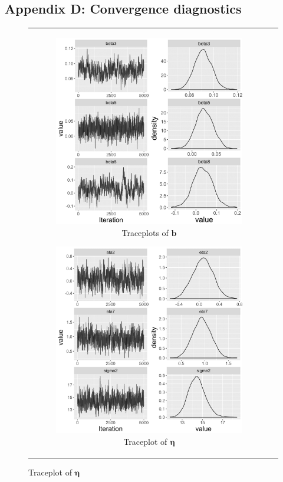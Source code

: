 \documentclass[ba]{imsart}
\numberwithin{equation}{section}
\theoremstyle{plain}
\begin{document}
		\subsection*{Appendix D: Convergence diagnostics}\label{appendix: convergence}
		\begin{figure}[H]
			\centering
			\begin{tabular}[t]{cc}
				\begin{subfigure}[b]{0.495\textwidth}
					\caption{Traceplots of $\boldsymbol{b}$}
					\includegraphics[width=\textwidth]{img/betatrace-1.png}	
				\end{subfigure}
				\begin{subfigure}[b]{0.495\textwidth}
					\caption{Traceplot of $\boldsymbol{\eta}$}
					\includegraphics[width=\textwidth]{img/etatrace-1.png}	

\end{subfigure}
\end{tabular}
\end{figure}
\end{document}
